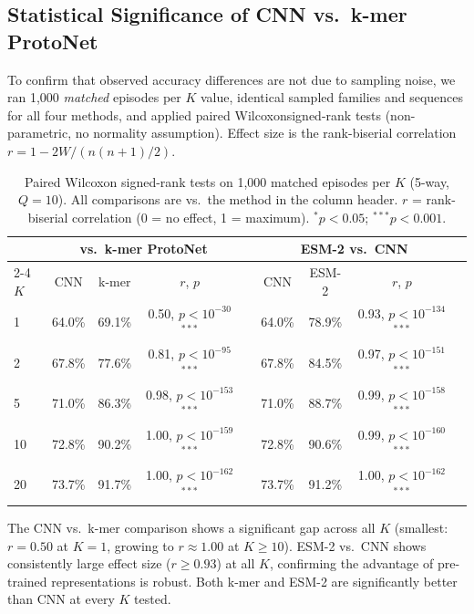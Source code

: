 \documentclass[11pt,a4paper]{article}
\begin{document}
\subsection{Statistical Significance of CNN vs.\ k-mer ProtoNet}
\label{sec:significance}

To confirm that observed accuracy differences are not due to sampling noise,
we ran 1{,}000 \emph{matched} episodes per $K$ value, identical sampled
         families and sequences for all four methods, and applied paired Wilcoxonsigned-rank tests (non-parametric, no normality assumption).  Effect size is
the rank-biserial correlation $r = 1 - 2W / (n(n+1)/2)$.

\begin{table}[H]
\centering
\caption{Paired Wilcoxon signed-rank tests on 1{,}000 matched episodes per $K$
         (5-way, $Q=10$).  All comparisons are vs.\ the method in the column
         header.  $r$ = rank-biserial correlation (0 = no effect, 1 = maximum).
         $^{*}p < 0.05$; $^{***}p < 0.001$.}
\label{tab:wilcoxon}
\small
\setlength{\tabcolsep}{4pt}
\begin{tabular}{lcccccccc}
\toprule
 & \multicolumn{3}{c}{\textbf{vs.\ k-mer ProtoNet}} & & \multicolumn{3}{c}{\textbf{ESM-2 vs.\ CNN}} \\
\cmidrule{2-4} \cmidrule{6-8}
$K$ & CNN & k-mer & $r$, $p$ & & CNN & ESM-2 & $r$, $p$ \\
\midrule
 1 & 64.0\% & 69.1\% & 0.50, $p{<}10^{-30}$ $^{***}$ & & 64.0\% & 78.9\% & 0.93, $p{<}10^{-134}$ $^{***}$ \\
 2 & 67.8\% & 77.6\% & 0.81, $p{<}10^{-95}$ $^{***}$  & & 67.8\% & 84.5\% & 0.97, $p{<}10^{-151}$ $^{***}$ \\
 5 & 71.0\% & 86.3\% & 0.98, $p{<}10^{-153}$ $^{***}$ & & 71.0\% & 88.7\% & 0.99, $p{<}10^{-158}$ $^{***}$ \\
10 & 72.8\% & 90.2\% & 1.00, $p{<}10^{-159}$ $^{***}$ & & 72.8\% & 90.6\% & 0.99, $p{<}10^{-160}$ $^{***}$ \\
20 & 73.7\% & 91.7\% & 1.00, $p{<}10^{-162}$ $^{***}$ & & 73.7\% & 91.2\% & 1.00, $p{<}10^{-162}$ $^{***}$ \\
\bottomrule
\end{tabular}
\end{table}

The CNN vs.\ k-mer comparison shows a significant gap across all $K$
(smallest: $r=0.50$ at $K=1$, growing to $r \approx 1.00$ at $K \geq 10$).
ESM-2 vs.\ CNN shows consistently large effect size ($r \geq 0.93$) at all $K$,
confirming the advantage of pre-trained representations is robust.
Both k-mer and ESM-2 are significantly better than CNN at every $K$ tested.
\end{document}

